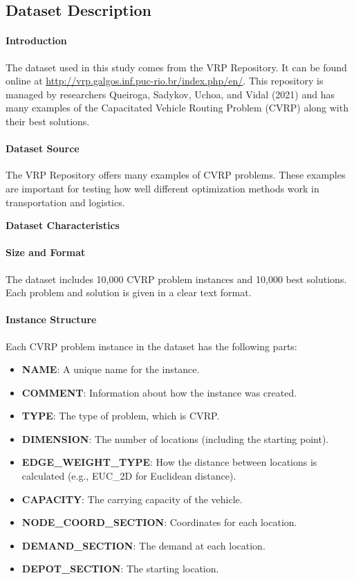 \documentclass{article}
\begin{document}
    \subsection{Dataset Description}

    \paragraph{Introduction}
    The dataset used in this study comes from the VRP Repository.
    It can be found online at \url{http://vrp.galgos.inf.puc-rio.br/index.php/en/}.
    This repository is managed by researchers Queiroga, Sadykov, Uchoa, and Vidal (2021) and has many examples of the Capacitated Vehicle Routing Problem (CVRP) along with their best solutions.

    \paragraph{Dataset Source}
    The VRP Repository offers many examples of CVRP problems.
    These examples are important for testing how well different optimization methods work in transportation and logistics.

    \textbf{Dataset Characteristics}

    \paragraph{Size and Format}
    The dataset includes 10,000 CVRP problem instances and 10,000 best solutions. Each problem and solution is given in a clear text format.

    \paragraph{Instance Structure}
    Each CVRP problem instance in the dataset has the following parts:
    \begin{itemize}
        \item \textbf{NAME}: A unique name for the instance.
        \item \textbf{COMMENT}: Information about how the instance was created.
        \item \textbf{TYPE}: The type of problem, which is CVRP.
        \item \textbf{DIMENSION}: The number of locations (including the starting point).
        \item \textbf{EDGE\_WEIGHT\_TYPE}: How the distance between locations is calculated (e.g., EUC\_2D for Euclidean distance).
        \item \textbf{CAPACITY}: The carrying capacity of the vehicle.
        \item \textbf{NODE\_COORD\_SECTION}: Coordinates for each location.
        \item \textbf{DEMAND\_SECTION}: The demand at each location.
        \item \textbf{DEPOT\_SECTION}: The starting location.
    \end{itemize}
\end{document}
